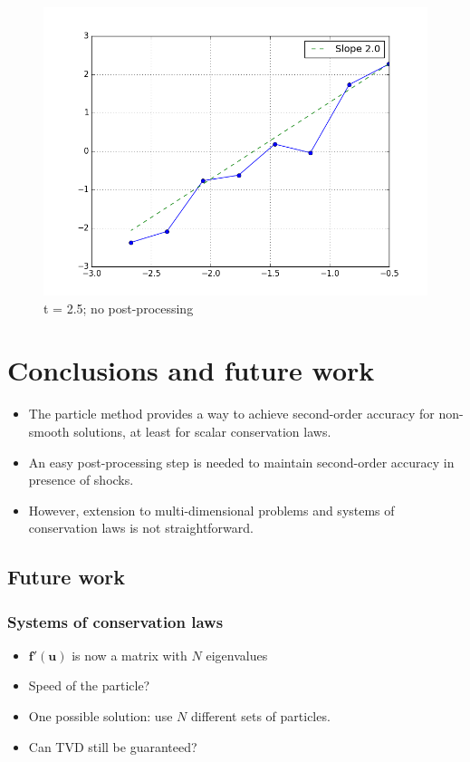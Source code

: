 \documentclass{article}
\let\bld\boldsymbol
\begin{document}
\begin{figure}
	\includegraphics[scale=0.5]{hp-t25-nolocate}
	\caption{t = 2.5; no post-processing}
\end{figure}
 

\section{Conclusions and future work}

\begin{itemize}
	\item The particle method provides a way to achieve second-order accuracy for non-smooth solutions, at least for scalar conservation laws.
	\item An easy post-processing step is needed to maintain second-order accuracy in presence of shocks.
	\item However, extension to multi-dimensional problems and systems of conservation laws is not straightforward.
\end{itemize}
 

\subsection{Future work}

\subsubsection{Systems of conservation laws}
\begin{itemize}
	\item $\bld{f}'(\bld{u})$ is now a matrix with $N$ eigenvalues
	\item Speed of the particle?
	\item One possible solution: use $N$ different sets of particles.
	\item Can TVD still be guaranteed?
\end{itemize}
 
\end{document}
